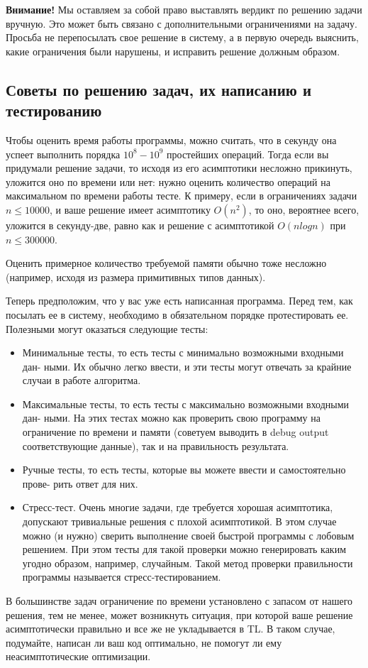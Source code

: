 \documentclass[12pt]{article}
\begin{document}
\textbf{Внимание!} Мы оставляем за собой право выставлять вердикт по решению
задачи вручную. Это может быть связано с дополнительными ограничениями 
на задачу. Просьба не перепосылать свое решение в систему, а в первую 
очередь выяснить, какие ограничения были нарушены, и исправить решение
должным образом.

\subsection{Советы по решению задач, их написанию и тестированию}
\label{advices}

Чтобы оценить время работы программы, можно считать, что в секунду она успеет 
выполнить порядка $10^8 - 10^9$  простейших операций. 
Тогда если вы придумали решение задачи, то исходя из его асимптотики несложно прикинуть, 
уложится оно по времени или нет: нужно оценить количество операций на максимальном по
времени работы тесте. К примеру,
если в ограничениях задачи $n \leq 10000$, и ваше решение имеет асимптотику
$O(n^2)$, то оно, вероятнее всего, уложится в секунду-две, равно как и решение 
с асимптотикой $O(n log n)$ при $n \leq 300000$.

Оценить примерное количество требуемой памяти обычно тоже несложно (например, 
исходя из размера примитивных типов данных). 

Теперь предположим, что у вас уже есть написанная программа. Перед тем, как 
посылать ее в систему, необходимо в обязательном порядке протестировать ее.
Полезными могут оказаться следующие тесты:

\begin{itemize}
\item Минимальные тесты, то есть тесты с минимально возможными входными дан-
ными. Их обычно легко ввести, и эти тесты могут отвечать за крайние случаи в
работе алгоритма.

\item Максимальные тесты, то есть тесты с максимально возможными входными дан-
ными. На этих тестах можно как проверить свою программу на ограничение по
времени и памяти (советуем выводить в debug output соответствующие данные),
так и на правильность результата.

\item Ручные тесты, то есть тесты, которые вы можете ввести и самостоятельно прове-
рить ответ для них.

\item Стресс-тест. Очень многие задачи, где требуется хорошая асимптотика, 
допускают тривиальные решения с плохой асимптотикой. В этом случае можно 
(и нужно) сверить выполнение своей быстрой программы с лобовым решением. 
При этом тесты для такой проверки можно генерировать каким угодно образом, 
например, случайным. Такой метод проверки правильности программы называется 
стресс-тестированием. 

\end{itemize}

В большинстве задач ограничение по времени установлено с запасом от нашего решения, 
тем не менее, может возникнуть ситуация, при которой ваше решение асимптотически 
правильно и все же не укладывается в TL. В таком случае, подумайте, написан ли ваш
код оптимально, не помогут ли ему неасимптотические оптимизации.
\end{document}
